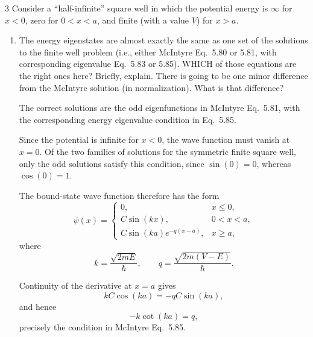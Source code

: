 \documentclass[11pt]{article}
\begin{document}
\begin{problem}{3}
  Consider a ``half-infinite'' square well in which the potential energy is \(\infty\) for \(x<0\), zero for \(0<x<a\), and finite (with a value \(V\)) for \(x>a\).
  \begin{enumerate}[label=(\alph*)]
    \item The energy eigenstates are almost exactly the same as one set of the solutions to the finite well problem (i.e., either McIntyre Eq.~5.80 or 5.81, with corresponding eigenvalue Eq.~5.83 or 5.85).
      WHICH of those equations are the right ones here?
      Briefly, explain.
      There is going to be one minor difference from the McIntyre solution (in normalization).
      What is that difference?
\begin{answer}
    The correct solutions are the odd eigenfunctions
    in McIntyre Eq.~5.81, with the corresponding
    energy eigenvalue condition in Eq.~5.85.

    Since the potential is infinite for \(x<0\),
    the wave function must vanish at \(x=0\).
    Of the two families of solutions for the
    symmetric finite square well, only the odd
    solutions satisfy this condition, since
    \(\sin(0)=0\), whereas \(\cos(0)=1\).

    The bound-state wave function therefore has
    the form
    \begin{equation}
      \label{eq:p3-wavefunction}
      \psi(x)=
      \begin{cases}
        0, & x\leq 0,\\
        C\sin(kx), & 0<x<a,\\
        C\sin(ka)e^{-q(x-a)}, & x\geq a,
      \end{cases}
    \end{equation}
    where
    \begin{equation}
      \label{eq:p3-parameters}
      k=\frac{\sqrt{2mE}}{\hbar},
      \qquad
      q=\frac{\sqrt{2m(V-E)}}{\hbar}.
    \end{equation}

    Continuity of the derivative at \(x=a\) gives
    \begin{equation}
      \label{eq:p3-boundary}
      kC\cos(ka)=-qC\sin(ka),
    \end{equation}
    and hence
    \begin{equation}
      \label{eq:p3-energy-condition}
      \boxed{-k\cot(ka)=q},
    \end{equation}
    precisely the condition in McIntyre Eq.~5.85.


\end{answer}
\end{enumerate}
\end{problem}
\end{document}
